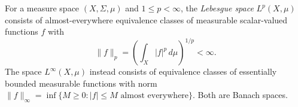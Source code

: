 
For a measure space $(X,\Sigma,\mu)$ and $1\le p<\infty$, the \emph{Lebesgue space} $L^p(X,\mu)$ consists of almost-everywhere equivalence classes of measurable scalar-valued functions $f$ with
\[
\|f\|_p=\left(\int_X|f|^p\,d\mu\right)^{1/p}<\infty.
\]
The space $L^\infty(X,\mu)$ instead consists of equivalence classes of essentially bounded measurable functions with norm $\|f\|_\infty=\inf\{M\ge0:|f|\le M\text{ almost everywhere}\}$. Both are Banach spaces.
